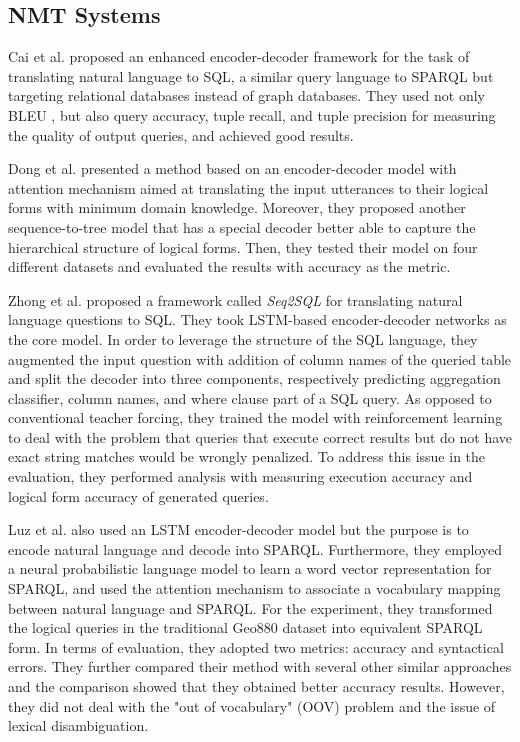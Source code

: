 \subsection{NMT Systems} \label{subsection:related work with nmt}

Cai et al. \cite{Cai2017} proposed an enhanced encoder-decoder framework for the task of translating natural language to SQL, a similar query language to SPARQL but targeting relational databases instead of graph databases. They used not only BLEU \cite{Papineni2002}, but also query accuracy, tuple recall, and tuple precision for measuring the quality of output queries, and achieved good results.

Dong et al. \cite{dong2016language} presented a method based on an encoder-decoder model with attention mechanism aimed at translating the input utterances to their logical forms with minimum domain knowledge. Moreover, they proposed another sequence-to-tree model that has a special decoder better able to capture the hierarchical structure of logical forms. Then, they tested their model on four different datasets and evaluated the results with accuracy as the metric.

Zhong et al. \cite{DBLP:journals/corr/abs-1709-00103} proposed a framework called \textit{Seq2SQL} for translating natural language questions to SQL. They took LSTM-based encoder-decoder networks as the core model. In order to leverage the structure of the SQL language, they augmented the input question with addition of column names of the queried table and split the decoder into three components, respectively predicting aggregation classifier, column names, and where clause part of a SQL query. As opposed to conventional teacher forcing, they trained the model with reinforcement learning to deal with the problem that queries that execute correct results but do not have exact string matches would be wrongly penalized. To address this issue in the evaluation, they performed analysis with measuring execution accuracy and logical form accuracy of generated queries.

Luz et al. \cite{Luz2018} also used an LSTM encoder-decoder model but the purpose is to encode natural language and decode into SPARQL. Furthermore, they employed a neural probabilistic language model to learn a word vector representation for SPARQL, and used the attention mechanism to associate a vocabulary mapping between natural language and SPARQL. For the experiment, they transformed the logical queries in the traditional Geo880 dataset into equivalent SPARQL form. In terms of evaluation, they adopted two metrics: accuracy and syntactical errors. They further compared their method with several other similar approaches \cite{alagha2015using,Kaufmann06querix:a} and the comparison showed that they obtained better accuracy results. However, they did not deal with the "out of vocabulary" (OOV) problem and the issue of lexical disambiguation.

